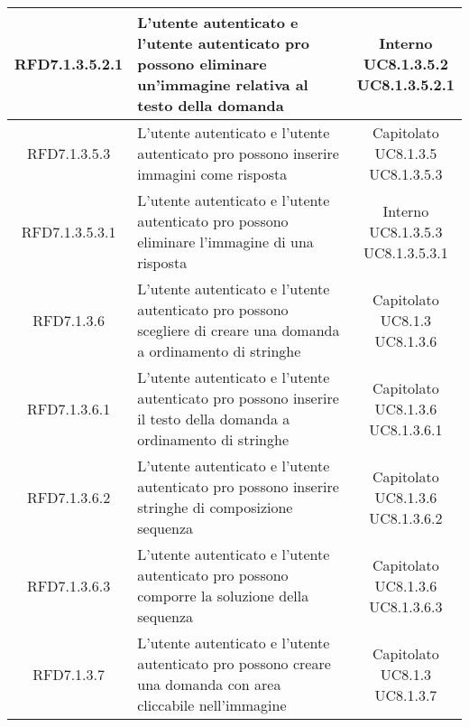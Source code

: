 \begin{longtable}{|c|>{\centering}m{7cm}|c|}
			 \hypertarget{{RFD7.1.3.5.2.1}}{{RFD7.1.3.5.2.1}} & L’utente autenticato e l’utente autenticato pro possono eliminare un'immagine relativa al testo della domanda  & \makecell{Interno\\ UC8.1.3.5.2 \\UC8.1.3.5.2.1 } \\ \hline
			 \hypertarget{{RFD7.1.3.5.3}}{{RFD7.1.3.5.3}} & L’utente autenticato e l’utente autenticato pro possono inserire immagini come risposta & \makecell{Capitolato\\ UC8.1.3.5 \\UC8.1.3.5.3 } \\ \hline
			 \hypertarget{{RFD7.1.3.5.3.1}}{{RFD7.1.3.5.3.1}} & L’utente autenticato e l’utente autenticato pro possono eliminare l’immagine di una risposta & \makecell{Interno\\ UC8.1.3.5.3 \\UC8.1.3.5.3.1 } \\ \hline
			 \hypertarget{{RFD7.1.3.6}}{{RFD7.1.3.6}} & L’utente autenticato e l’utente autenticato pro possono scegliere di creare una domanda a ordinamento di stringhe & \makecell{Capitolato\\ UC8.1.3 \\UC8.1.3.6 } \\ \hline
			 \hypertarget{{RFD7.1.3.6.1}}{{RFD7.1.3.6.1}} & L’utente autenticato e l’utente autenticato pro possono inserire il testo della domanda a ordinamento di stringhe & \makecell{Capitolato\\ UC8.1.3.6 \\UC8.1.3.6.1 } \\ \hline
			 \hypertarget{{RFD7.1.3.6.2}}{{RFD7.1.3.6.2}} & L’utente autenticato e l’utente autenticato pro possono inserire stringhe di composizione sequenza & \makecell{Capitolato\\ UC8.1.3.6 \\UC8.1.3.6.2 } \\ \hline
			 \hypertarget{{RFD7.1.3.6.3}}{{RFD7.1.3.6.3}} & L’utente autenticato e l’utente autenticato pro possono comporre la soluzione della sequenza & \makecell{Capitolato\\ UC8.1.3.6 \\UC8.1.3.6.3 } \\ \hline
			 \hypertarget{{RFD7.1.3.7}}{{RFD7.1.3.7}} & L’utente autenticato e l’utente autenticato pro possono creare una domanda con area cliccabile nell’immagine & \makecell{Capitolato\\ UC8.1.3 \\UC8.1.3.7 } \\ \hline

\end{longtable}
